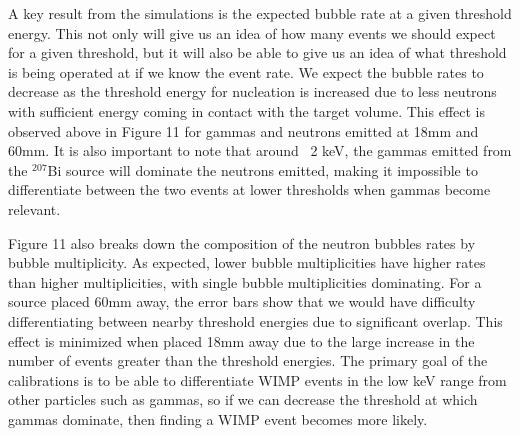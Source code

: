 \documentclass[%
12pt,
twoside,
reprint,
amsmath,amssymb,
aps,
]{article}
\begin{document}
	\par A key result from the simulations is the expected bubble rate at a given threshold energy. This not only will give us an idea of how many events we should expect for a given threshold, but it will also be able to give us an idea of what threshold is being operated at if we know the event rate. We expect the bubble rates to decrease as the threshold energy for nucleation is increased due to less neutrons with sufficient energy coming in contact with the target volume. This effect is observed above in Figure 11 for gammas and neutrons emitted at 18mm and 60mm. It is also important to note that around ~2 keV, the gammas emitted from the $^{207}$Bi source will dominate the neutrons emitted, making it impossible to differentiate between the two events at lower thresholds when gammas become relevant.
	\par Figure 11 also breaks down the composition of the neutron bubbles rates by bubble multiplicity. As expected, lower bubble multiplicities have higher rates than higher multiplicities, with single bubble multiplicities dominating. For a source placed 60mm away, the error bars show that we would have difficulty differentiating between nearby threshold energies due to significant overlap. This effect is minimized when placed 18mm away due to the large increase in the number of events greater than the threshold energies. The primary goal of the calibrations is to be able to differentiate WIMP events in the low keV range from other particles such as gammas, so if we can decrease the threshold at which gammas dominate, then finding a WIMP event becomes more likely.
\end{document}
